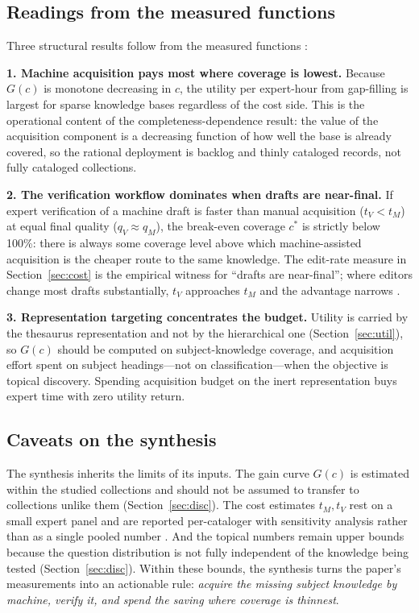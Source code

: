 \subsection{Readings from the measured functions}
\label{sec:synth:readings}

Three structural results follow from the measured functions
:

\textbf{1. Machine acquisition pays most where coverage is lowest.}
Because $G(c)$ is monotone decreasing in $c$, the utility per expert-hour
from gap-filling is largest for sparse knowledge bases regardless of the
cost side. This is the operational content of the completeness-dependence
result: the value of the acquisition component is a decreasing function of
how well the base is already covered, so the rational deployment is
backlog and thinly cataloged records, not fully cataloged collections.

\textbf{2. The verification workflow dominates when drafts are near-final.}
If expert verification of a machine draft is faster than manual acquisition
($t_V < t_M$) at equal final quality ($q_V \approx q_M$), the break-even
coverage $c^{*}$ is strictly below 100\%: there is always some coverage
level above which machine-assisted acquisition is the cheaper route to the
same knowledge. The edit-rate measure in Section~\ref{sec:cost} is the
empirical witness for ``drafts are near-final''; where editors change most
drafts substantially, $t_V$ approaches $t_M$ and the advantage narrows
.

\textbf{3. Representation targeting concentrates the budget.}
Utility is carried by the thesaurus representation and not by the
hierarchical one (Section~\ref{sec:util}), so $G(c)$ should be computed on
subject-knowledge coverage, and acquisition effort spent on subject
headings---not on classification---when the objective is topical discovery.
Spending acquisition budget on the inert representation buys expert time
with zero utility return.

\subsection{Caveats on the synthesis}

The synthesis inherits the limits of its inputs. The gain curve $G(c)$ is
estimated within the studied collections and should not be assumed to
transfer to collections unlike them (Section~\ref{sec:disc}). The cost
estimates $t_M, t_V$ rest on a small expert panel and are reported
per-cataloger with sensitivity analysis rather than as a single pooled
number . And the topical numbers remain upper bounds because the
question distribution is not fully independent of the knowledge being
tested (Section~\ref{sec:disc}). Within these bounds, the synthesis turns
the paper's measurements into an actionable rule: \emph{acquire the missing
subject knowledge by machine, verify it, and spend the saving where
coverage is thinnest}.
